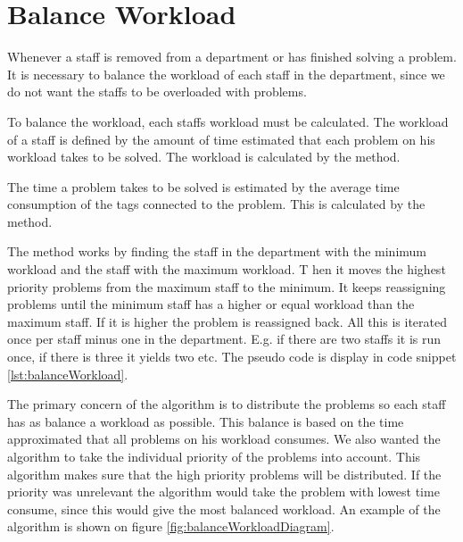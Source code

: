 \section{Balance Workload}
Whenever a staff is removed from a department or has finished solving a problem. 
It is necessary to balance the workload of each staff in the department, since we do not want the staffs to be overloaded with problems. 

To balance the workload, each staffs workload must be calculated. 
The workload of a staff is defined by the amount of time estimated that each problem on his workload takes to be solved. 
The workload is calculated by the  method.

The time a problem takes to be solved is estimated by the average time consumption of the tags connected to the problem. 
This is calculated by the  method.

The  method works by finding the staff in the department with the minimum workload and the staff with the maximum workload. T
hen it moves the highest priority problems from the maximum staff to the minimum. 
It keeps reassigning problems until the minimum staff has a higher or equal workload than the maximum staff. If it is higher the problem is reassigned back. 
All this is iterated once per staff minus one in the department. 
E.g. if there are two staffs it is run once, if there is three it yields two etc. 
The pseudo code is display in code snippet \ref{lst:balanceWorkload}.

The primary concern of the algorithm is to distribute the problems so each staff has as balance a workload as possible. 
This balance is based on the time approximated that all problems on his workload consumes. 
We also wanted the algorithm to take the individual priority of the problems into account. 
This algorithm makes sure that the high priority problems will be distributed. 
If the priority was unrelevant the algorithm would take the problem with lowest time consume, since this would give the most balanced workload. 
An example of the algorithm is shown on figure \ref{fig:balanceWorkloadDiagram}. 



